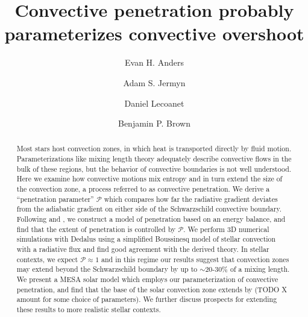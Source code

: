 \documentclass[twocolumn]{aastex631}
\newcommand{\mP}{\ensuremath{\mathcal{P}}}
\begin{document}
\title{Convective penetration probably parameterizes convective overshoot}
\author[0000-0002-3433-4733]{Evan H. Anders}
\author[0000-0001-5048-9973]{Adam S. Jermyn}
\author[0000-0002-7635-9728]{Daniel Lecoanet}
\author[0000-0001-8935-219X]{Benjamin P. Brown}


\begin{abstract}
Most stars host convection zones, in which heat is transported directly by fluid motion.
Parameterizations like mixing length theory adequately describe convective flows in the bulk of these regions, but the behavior of convective boundaries is not well understood.
Here we examine how convective motions mix entropy and in turn extend the size of the convection zone, a process referred to as convective penetration.
We derive a ``penetration parameter'' $\mP$ which compares how far the radiative gradient deviates from the adiabatic gradient on either side of the Schwarzschild convective boundary.
Following \citet{roxburgh1989} and \citet{zahn1991}, we construct a model of penetration based on an energy balance, and find that the extent of penetration is controlled by $\mP$.
We perform 3D numerical simulations with Dedalus using a simplified Boussinesq model of stellar convection with a radiative flux and find good agreement with the derived theory.
In stellar contexts, we expect $\mathcal{P} \approx 1$ and in this regime our results suggest that convection zones may extend beyond the Schwarzschild boundary by up to $\sim$20-30\% of a mixing length.
We present a MESA solar model which employs our parameterization of convective penetration, and find that the base of the solar convection zone extends by (TODO X amount for some choice of parameters).
We further discuss prospects for extending these results to more realistic stellar contexts.
\end{abstract}



\end{document}
